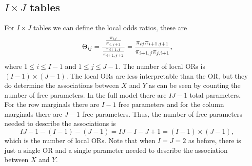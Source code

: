 \subsection{$I \times J$ tables}
For $I \times J$ tables we can define the local odds ratios, these are 
\[{\Theta}_{ij} = \frac{\frac{\pi_{ij}}{\pi_{i,j+1}}}{\frac{\pi_{i+1,j}}{\pi_{i+1,j+1}}} = \frac{\pi_{ij}\pi_{i+1,j+1}}{\pi_{i+1,j}\pi_{j,i+1}}, \]
where $1 \le i \le I-1$ and $1 \le j \le J-1$. The number of local ORs is $(I-1)\times (J-1)$. The local ORs are less interpretable than the OR, but they do determine the associations between $X$ and $Y$ as can be seen by counting the number of free parameters. In the full model there are $IJ-1$ total parameters. For the row marginals there are $I-1$ free parameters and for the column marginals there are $J-1$ free parameters. Thus, the number of free parameters needed to describe the associations is
\[IJ-1 - (I-1)-(J-1) = IJ-I-J+1=(I-1)\times(J-1), \]
which is the number of local ORs. Note that when $I=J=2$ as before, there is just a single OR and a single parameter needed to describe the association between $X$ and $Y$.
